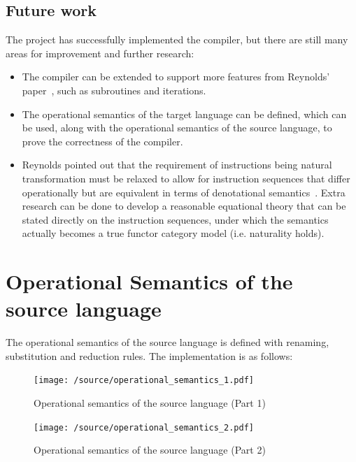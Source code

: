 \documentclass[12pt,a4paper]{report}
\theoremstyle{definition}
\begin{document}
    \section{Future work}
    The project has successfully implemented the compiler, but there are still many areas for improvement and further research:
    \begin{itemize}
        \item 
            The compiler can be extended to support more features from Reynolds' paper~\autocite{Reynolds}, such as subroutines and iterations.
        \item
            The operational semantics of the target language can be defined, which can be used, along with the operational semantics of the source language, to prove the correctness of the compiler.
        \item
            Reynolds pointed out that the requirement of instructions being natural transformation must be relaxed to allow for instruction sequences that differ operationally but are equivalent in terms of denotational semantics~\autocite[Ch. 6]{Reynolds}. Extra research can be done to develop a reasonable equational theory that can be stated directly on the instruction sequences, under which the semantics actually becomes a true functor category model (i.e. naturality holds).
    \end{itemize}

\printbibliography

\appendix

\chapter{Operational Semantics of the source language} \label{app: operational_semantics}
    \minitoc
    The operational semantics of the source language is defined with renaming, substitution and reduction rules. The implementation is as follows:
    \begin{figure}[H]
        \centering
        \texttt{[image: /source/operational\_semantics\_1.pdf]}
        \caption{Operational semantics of the source language (Part 1)}
        \label{fig: operational_semantics_1}
    \end{figure}
    \begin{figure}[H]
        \centering
        \texttt{[image: /source/operational\_semantics\_2.pdf]}
        \caption{Operational semantics of the source language (Part 2)}
        \label{fig: operational_semantics_2}
    \end{figure}


\cleardoublepage
\let\cleardoublepage\clearpage
\pagestyle{empty}

\AtBeginShipoutNext{\AtBeginShipoutDiscard}
\end{document}
